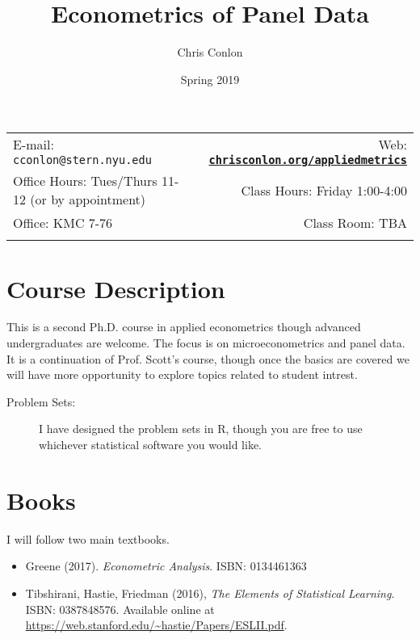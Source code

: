 \documentclass[11pt]{article}
\title{Econometrics of Panel Data}\author{Chris Conlon}
\date{Spring 2019}
\newcommand{\blankline}{\quad\pagebreak[2]}
\begin{document}
\maketitle

\blankline

\begin{tabular*}{.93\textwidth}{@{\extracolsep{\fill}}lr}


  E-mail: \texttt{cconlon@stern.nyu.edu} & Web: \href{http://chrisconlon.org}{\tt\bf chrisconlon.org/appliedmetrics}  \\

 Office Hours: Tues/Thurs 11-12 (or by appointment) &  Class Hours: Friday 1:00-4:00 \\


 Office: KMC 7-76  & Class Room: TBA \\
&  \\
\hline
\end{tabular*}

\vspace{10 mm}

\section*{Course Description}
This is a second Ph.D. course in applied econometrics though advanced undergraduates are welcome. The focus is on microeconometrics and panel data. It is a continuation of Prof. Scott's course, though once the basics are covered we will have more opportunity to explore topics related to student intrest.

\begin{description}
\item[Problem Sets:] I have designed the problem sets in R, though you are free to use whichever statistical software you would like. 
\end{description}

\section*{Books}
I will follow two main textbooks.
\begin{itemize}
\item Greene (2017). \textit{Econometric Analysis}. ISBN: 0134461363
\item Tibshirani, Hastie, Friedman (2016), \textit{The Elements of Statistical Learning}. ISBN: 0387848576. Available online at \url{https://web.stanford.edu/~hastie/Papers/ESLII.pdf}.
\end{itemize} 
\end{document}
